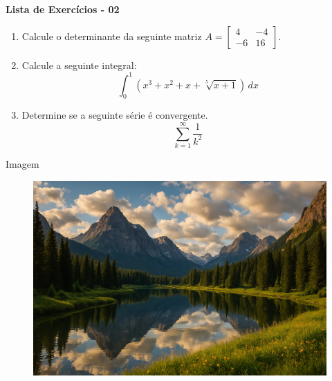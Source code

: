 \documentclass[a4paper]{article}
\begin{document}
\begin{center}
    \textbf{Lista de Exercícios - 02}
\end{center}

\begin{enumerate}

    \item Calcule o determinante da seguinte matriz $A =
              \begin{bmatrix}
                  4  & -4 \\
                  -6 & 16
              \end{bmatrix}$.

    \item Calcule a seguinte integral:
          \[
              \int_0^1 \left( x^3 + x^2 + x + \sqrt[5]{x+1} \right) \, dx
          \]

    \item Determine se a seguinte série é convergente.
          \[
              \sum_{k=1}^{\infty} \frac{1}{k^2}
          \]

\end{enumerate}
\newpage

Imagem
\begin{figure}[h]
    \includegraphics[angle=0, scale=0.15]{imagens/gpt.png}
\end{figure}
\end{document}
